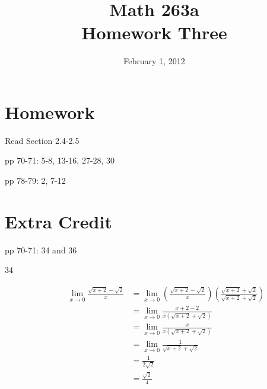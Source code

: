\documentclass{exam}
\title{Math 263a \\ Homework Three}
\date{February 1, 2012}
\begin{document}
  \maketitle

  \section{Homework}

  \begin{itemize*}
    \item Read Section 2.4-2.5
    \item pp 70-71: 5-8, 13-16, 27-28, 30
    \item pp 78-79: 2, 7-12
  \end{itemize*}

  \section{Extra Credit}
  \begin{itemize*}
  \item pp 70-71: 34 and 36
  \end{itemize*}

  \ifprintanswers

  \begin{description}
    \item[34]
    \begin{align*}
      \lim_{x \to 0} \frac{\sqrt{x+2} - \sqrt{2}}{x} 
        &= \lim_{x \to 0} \left( \frac{\sqrt{x+2} - \sqrt{2}}{x} \right) \left( \frac{\sqrt{x+2} + \sqrt{2}}{\sqrt{x+2} + \sqrt{2}} \right) \\
        &= \lim_{x \to 0} \frac{x+2 - 2}{x(\sqrt{x+2} + \sqrt{2})}  \\
        &= \lim_{x \to 0} \frac{x}{x(\sqrt{x+2} + \sqrt{2})} \\
        &= \lim_{x \to 0} \frac{1}{\sqrt{x+2} + \sqrt{2}} \\
        &= \frac{1}{2 \sqrt{2}} \\
        &= \frac{\sqrt{2}}{4} \\
    \end{align*}
  \end{description}
\end{document}

